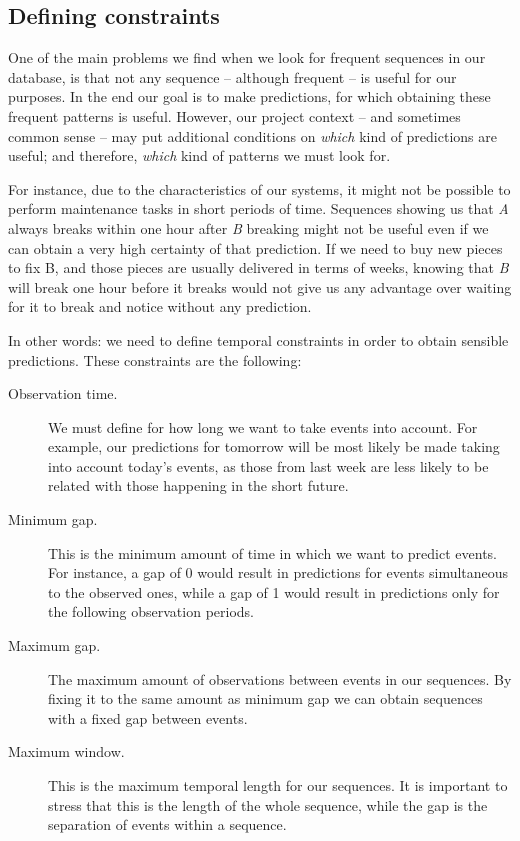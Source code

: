 \documentclass[a4paper,12pt]{article}
\begin{document}
\subsection{Defining constraints}
One of the main problems we find when we look for frequent sequences in our database, is that not any sequence -- although frequent -- is useful for our purposes. In the end our goal is to make predictions, for which obtaining these frequent patterns is useful. However, our project context -- and sometimes common sense -- may put additional conditions on \emph{which} kind of predictions are useful; and therefore, \emph{which} kind of patterns we must look for.

For instance, due to the characteristics of our systems, it might not be possible to perform maintenance tasks in short periods of time. Sequences showing us that \emph{A} always breaks within one hour after \emph{B} breaking might not be useful even if we can obtain a very high certainty of that prediction. If we need to buy new pieces to fix B, and those pieces are usually delivered in terms of weeks, knowing that \emph{B} will break one hour before it breaks would not give us any advantage over waiting for it to break and notice without any prediction.

In other words: we need to define temporal constraints in order to obtain sensible predictions\cite{zaki2000cspade}. These constraints are the following:

\begin{description}
\item[Observation time.] We must define for how long we want to take events into account. For example, our predictions for tomorrow will be most likely be made taking into account today's events, as those from last week are less likely to be related with those happening in the short future.
\item[Minimum gap.] This is the minimum amount of time in which we want to predict events. For instance, a gap of 0 would result in predictions for events simultaneous to the observed ones, while a gap of 1 would result in predictions only for the following observation periods.
\item[Maximum gap.] The maximum amount of observations between events in our sequences. By fixing it to the same amount as minimum gap we can obtain sequences with a fixed gap between events.
\item[Maximum window.] This is the maximum temporal length for our sequences. It is important to stress that this is the length of the whole sequence, while the gap is the separation of events within a sequence.
\end{description}
\end{document}
